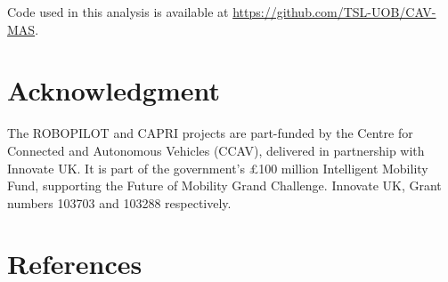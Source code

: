 \documentclass[letterpaper, 10 pt, journal, twoside]{IEEEtran}
\begin{document}
Code used in this analysis is available at \url{https://github.com/TSL-UOB/CAV-MAS}.


\section*{Acknowledgment}
The ROBOPILOT and CAPRI projects are part-funded by the Centre for Connected and Autonomous Vehicles
(CCAV), delivered in partnership with Innovate UK. It is part of the government’s £100 million
Intelligent Mobility Fund, supporting the Future of Mobility Grand Challenge. %
Innovate UK, Grant numbers 103703 and 103288 respectively. 


\balance
\section*{References}
\printbibliography[heading=none]
\end{document}
